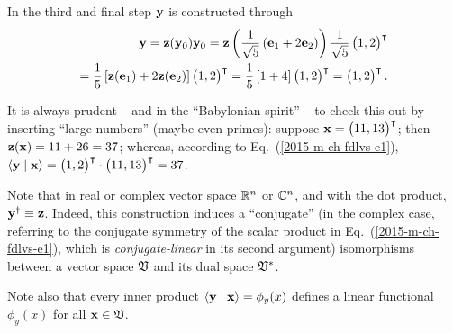 {In the third and final step ${\bf y}$ is constructed through
\begin{equation}
\begin{split}
{\bf y}
=  {\bf z}  ( {\bf y}_0 ){\bf y}_0
=  {\bf z}  \left( \frac{1}{\sqrt{5}}\left( {\bf e}_1 +2 {\bf e}_2 \right) \right)\frac{1}{\sqrt{5}} \begin{pmatrix} 1,2\end{pmatrix}^\intercal   \\
= \frac{1}{5}  \left[ {\bf z} ( {\bf e}_1) + 2 {\bf z}  ( {\bf e}_2 ) \right] \begin{pmatrix} 1,2\end{pmatrix}^\intercal
= \frac{1}{5}  \left[ 1 + 4 \right] \begin{pmatrix} 1,2\end{pmatrix}^\intercal
=    \begin{pmatrix} 1,2\end{pmatrix}^\intercal
.
\end{split}
\end{equation}

It is always prudent -- and in the ``Babylonian spirit'' -- to check this out by inserting ``large numbers'' (maybe even primes):
suppose ${\bf x} =\begin{pmatrix} 11,13\end{pmatrix}^\intercal $; then
${\bf z}  ( {\bf x} ) = 11 + 26 = 37$; whereas, according to Eq.~(\ref{2015-m-ch-fdlvs-e1}),
$\langle {\bf y}\mid {\bf x}\rangle = \begin{pmatrix} 1,2\end{pmatrix}^\intercal   \cdot      \begin{pmatrix} 11,13\end{pmatrix}^\intercal
= 37$.


\eexample
}

Note that  in  real or complex vector space ${\Bbb R}^n$ or ${\Bbb C}^n$, and with the dot product,  ${\bf y}^\dagger \equiv {\bf z}$.
Indeed, this construction induces a ``conjugate'' (in the complex case, referring to the conjugate symmetry of the scalar product
in Eq.~(\ref{2015-m-ch-fdlvs-e1}),
which is {\em conjugate-linear} in its second argument) isomorphisms between a vector space
${\frak V}$ and its dual space ${\frak V}^\ast$.


Note also that every inner product
$\langle {\bf y}\mid {\bf x} \rangle = \phi_y(x)$ defines a linear
functional $\phi_y(x)$ for all ${\bf x}\in {\frak V}$.




